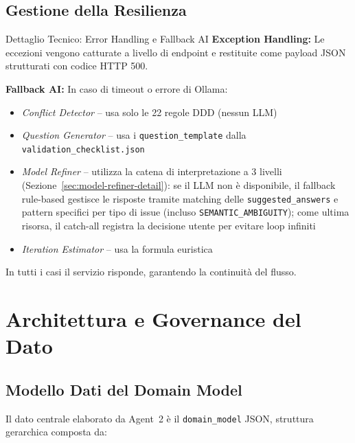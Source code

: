 \documentclass[12pt,a4paper]{report}
\begin{document}
\section{Gestione della Resilienza}

\begin{technicalbox}{Dettaglio Tecnico: Error Handling e Fallback AI}
\textbf{Exception Handling:} Le eccezioni vengono catturate a livello
di endpoint e restituite come payload JSON strutturati con codice HTTP 500.

\textbf{Fallback AI:} In caso di timeout o errore di Ollama:
\begin{itemize}
  \item \textit{Conflict Detector} -- usa solo le 22 regole DDD (nessun LLM)
  \item \textit{Question Generator} -- usa i \texttt{question\_template}
        dalla \texttt{validation\_checklist.json}
  \item \textit{Model Refiner} -- utilizza la catena di interpretazione a 3 livelli
        (Sezione~\ref{sec:model-refiner-detail}): se il LLM non è disponibile,
        il fallback rule-based gestisce le risposte tramite matching delle
        \texttt{suggested\_answers} e pattern specifici per tipo di issue
        (incluso \texttt{SEMANTIC\_AMBIGUITY}); come ultima risorsa, il catch-all
        registra la decisione utente per evitare loop infiniti
  \item \textit{Iteration Estimator} -- usa la formula euristica
\end{itemize}
In tutti i casi il servizio risponde, garantendo la continuità del flusso.
\end{technicalbox}

\chapter{Architettura e Governance del Dato}

\section{Modello Dati del Domain Model}

Il dato centrale elaborato da Agent~2 è il \texttt{domain\_model} JSON,
struttura gerarchica composta da:
\end{document}
